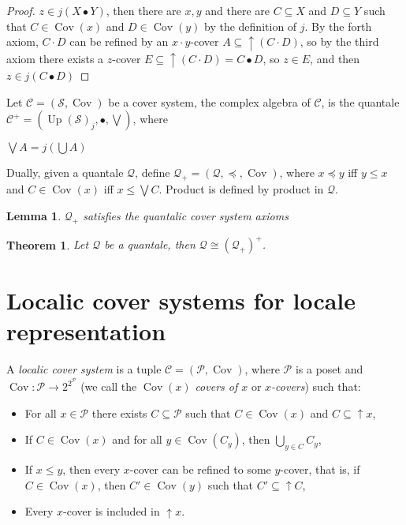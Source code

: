 \documentclass[a4paper]{article}
\theoremstyle{defin}
\theoremstyle{theorem}
\newtheorem{theorem}{Theorem}
\theoremstyle{claim}
\theoremstyle{prop}
\theoremstyle{lemma}
\newtheorem{lemma}{Lemma}
\theoremstyle{fact}
\theoremstyle{ex}
\theoremstyle{col}
\begin{document}
\begin{proof}
$z \in j (X \bullet Y)$, then there are $x, y$ and there are $C \subseteq X$ and $D \subseteq Y$ such that $C \in \operatorname{Cov}(x)$ and $D \in \operatorname{Cov}(y)$ by the definition of $j$. By the forth axiom, $C \cdot D$ can be refined by an $x \cdot y$-cover $A \subseteq \uparrow (C \cdot D)$, so by the third axiom there exists a $z$-cover $E \subseteq \uparrow (C \cdot D) = C \bullet D$, so $z \in E$, and then $z \in j (C \bullet D)$
\end{proof}

Let $\mathcal{C} = (\mathcal{S}, \operatorname{Cov})$ be a cover system, the complex algebra of $\mathcal{C}$, is the quantale $\mathcal{C}^{+} = (\operatorname{Up}(\mathcal{S})_j, \bullet, \bigvee)$, where
\begin{center}
$\bigvee A = j (\bigcup A)$
\end{center}

Dually, given a quantale $\mathcal{Q}$, define $\mathcal{Q}_+ = (\mathcal{Q}, \preceq, \operatorname{Cov})$, where
$x \preceq y$ iff $y \leq x$ and $C \in \operatorname{Cov}(x)$ iff $x \leq \bigvee C$. Product is defined by product in $\mathcal{Q}$.

\begin{lemma}
$\mathcal{Q}_+$ satisfies the quantalic cover system axioms
\end{lemma}

\begin{theorem}
Let $\mathcal{Q}$ be a quantale, then $\mathcal{Q} \cong (\mathcal{Q}_+)^+$.
\end{theorem}


\section{Localic cover systems for locale representation}

A \emph{localic cover system} is a tuple $\mathcal{C} = (\mathcal{P}, \operatorname{Cov})$, where $\mathcal{P}$ is a poset and $\operatorname{Cov} : \mathcal{P} \to 2^{2^{\mathcal{P}}}$ (we call the $\operatorname{Cov}(x)$ \emph{covers of $x$} or \emph{$x$-covers}) such that:
\begin{itemize}
\item For all $x \in \mathcal{P}$ there exists $C \subseteq \mathcal{P}$ such that $C \in \operatorname{Cov}(x)$ and $C \subseteq \uparrow x$,
\item If $C \in \operatorname{Cov}(x)$ and for all $y \in \operatorname{Cov}(C_y)$, then $\bigcup \limits_{y \in C} C_y$,
\item If $x \leq y$, then every $x$-cover can be refined to some $y$-cover, that is, if $C \in \operatorname{Cov}(x)$, then $C' \in \operatorname{Cov}(y)$ such that $C' \subseteq \uparrow C$,
\item Every $x$-cover is included in $\uparrow x$.
\end{itemize}
\end{document}
